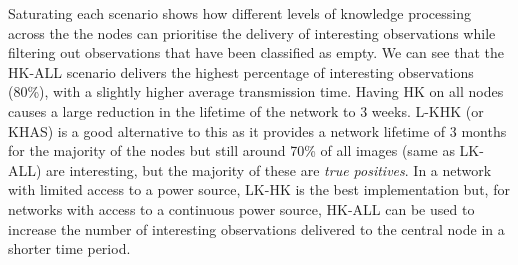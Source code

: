 Saturating each scenario shows how different levels of knowledge processing across the the nodes can prioritise the delivery of interesting observations while filtering out observations that have been classified as empty. We can see that the HK-ALL scenario delivers the highest percentage of interesting observations (80\%), with a slightly higher average transmission time. Having HK on all nodes causes a large reduction in the lifetime of the network to 3 weeks. L-KHK (or KHAS) is a good alternative to this as it provides a network lifetime of 3 months for the majority of the nodes but still around 70\% of all images (same as LK-ALL) are interesting, but the majority of these are \textit{true positives}. In a network with limited access to a power source, LK-HK is the best implementation but, for networks with access to a continuous power source, HK-ALL can be used to increase the number of interesting observations delivered to the central node in a shorter time period.




